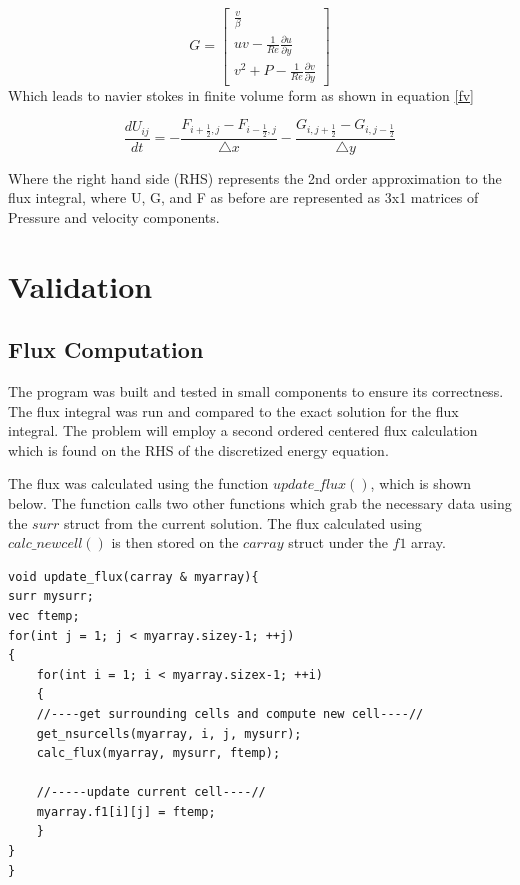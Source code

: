 \documentclass[paper=a4, fontsize=11pt, abstract=on]{scrartcl}
\numberwithin{equation}{section}		%
\numberwithin{figure}{section}			%
\numberwithin{table}{section}				%
\begin{document}
\begin{equation}
\label{nav}
G= \begin{bmatrix}
    \frac{v}{\beta}    \\
   uv-\frac{1}{Re}\frac{\partial u}{\partial y} \\
    v^2+P-\frac{1}{Re}\frac{\partial v}{\partial y} 
\end{bmatrix}
\end{equation} 
Which leads to navier stokes in finite volume form as shown in equation \ref{fv}


\begin{equation}
\label{fv}
\frac{d U_{ij}}{d t} = -\frac{F_{i+\frac{1}{2},j}-F_{i-\frac{1}{2},j}}{\triangle x} -\frac{G_{i, j+\frac{1}{2}}-G_{i,j-\frac{1}{2}}}{\triangle y}
\end{equation} 

Where the right hand side (RHS) represents the 2nd order approximation to the flux integral, where U, G, and F as before are represented as 3x1 matrices of Pressure and velocity components.
\section{Validation}
\subsection{Flux Computation}

 The program was built and tested in small components to ensure its correctness. The flux integral was run and compared to the exact solution for the flux integral. The problem will employ a second ordered centered flux calculation which is found on the RHS of the discretized energy equation.


The flux was calculated using the function $update\_ flux()$, which is shown below. The function calls two other functions which grab the necessary data using the $surr$ struct from the current solution. The flux calculated using $calc\_ newcell()$ is then stored on the $carray$ struct under the $f1$ array.

\begin{lstlisting}
void update_flux(carray & myarray){
surr mysurr;
vec ftemp;
for(int j = 1; j < myarray.sizey-1; ++j)
{
    for(int i = 1; i < myarray.sizex-1; ++i)
    {
    //----get surrounding cells and compute new cell----//
    get_nsurcells(myarray, i, j, mysurr);    
    calc_flux(myarray, mysurr, ftemp); 
    
    //-----update current cell----//  
    myarray.f1[i][j] = ftemp;   
    }
}
}
\end{lstlisting}
\end{document}
